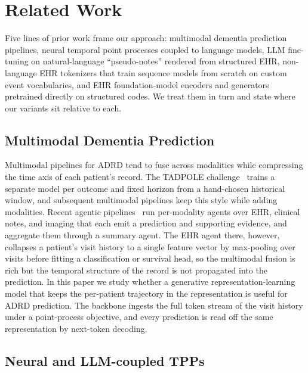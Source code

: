 \documentclass{article}
\begin{document}
\section{Related Work}
\label{sec:related}

Five lines of prior work frame our approach: multimodal dementia prediction pipelines, neural temporal point processes coupled to language models, LLM fine-tuning on natural-language ``pseudo-notes'' rendered from structured EHR, non-language EHR tokenizers that train sequence models from scratch on custom event vocabularies, and EHR foundation-model encoders and generators pretrained directly on structured codes.
We treat them in turn and state where our variants sit relative to each.

\subsection{Multimodal Dementia Prediction}

Multimodal pipelines for ADRD tend to fuse across modalities while compressing the time axis of each patient's record. The TADPOLE challenge~\citep{marinescu2019tadpole} trains a separate model per outcome and fixed horizon from a hand-chosen historical window, and subsequent multimodal pipelines keep this style while adding modalities. Recent agentic pipelines~\citep{liu2026multidisciplinary} run per-modality agents over EHR, clinical notes, and imaging that each emit a prediction and supporting evidence, and aggregate them through a summary agent. The EHR agent there, however, collapses a patient's visit history to a single feature vector by max-pooling over visits before fitting a classification or survival head, so the multimodal fusion is rich but the temporal structure of the record is not propagated into the prediction. In this paper we study whether a generative representation-learning model that keeps the per-patient trajectory in the representation is useful for ADRD prediction. The backbone ingests the full token stream of the visit history under a point-process objective, and every prediction is read off the same representation by next-token decoding.

\subsection{Neural and LLM-coupled TPPs}
\end{document}
